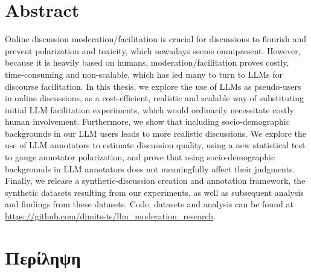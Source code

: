 %

\let\cleardoublepage\clearpage

\chapter*{Abstract}
\label{sec:abstract}

Online discussion moderation/facilitation is crucial for discussions to flourish and prevent polarization and toxicity, which nowadays seems omnipresent. However, because it is heavily based on humans, moderation/facilitation proves costly, time-consuming and non-scalable, which has led many to turn to LLMs for discourse facilitation. In this thesis, we explore the use of LLMs as pseudo-users in online discussions, as a cost-efficient, realistic and scalable way of substituting initial LLM facilitation experiments, which would ordinarily necessitate costly human involvement. Furthermore, we show that including socio-demographic backgrounds in our LLM users leads to more realistic discussions. We explore the use of LLM annotators to estimate discussion quality, using a new statistical test to gauge annotator polarization, and prove that using socio-demographic backgrounds in LLM annotators does not meaningfully affect their judgments. Finally, we release a synthetic-discussion creation and annotation framework, the synthetic datasets resulting from our experiments, as well as subsequent analysis and findings from these datasets. Code, datasets and analysis can be found at \url{https://github.com/dimits-ts/llm_moderation_research}.


\chapter*{Περίληψη}
\label{sec:abstract_greek}

